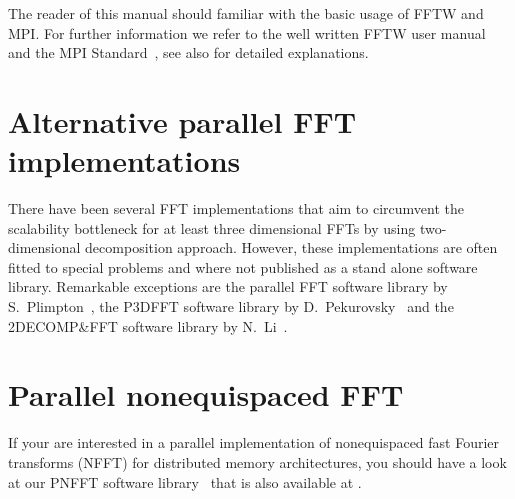 The reader of this manual should familiar with the basic usage of FFTW and MPI.
For further information we refer to the well written FFTW user manual~\cite{fftw-manual} and
the MPI Standard~\cite{MPI-2.2}, see also \cite{GrLuTh99} for detailed explanations.

\section{Alternative parallel FFT implementations}
There have been several FFT implementations that aim to circumvent the scalability bottleneck
for at least three dimensional FFTs by using two-dimensional decomposition approach.
However, these implementations are often fitted to special problems and where not published
as a stand alone software library. 
Remarkable exceptions are the parallel FFT software library by S.~Plimpton~\cite{Pl97,sandiafft},
the P3DFFT software library by D.~Pekurovsky~\cite{Pe12,p3dfft} and the \mbox{2DECOMP\&FFT} software library by N.~Li~\cite{Li2010, 2decompfft}.

\section{Parallel nonequispaced FFT}
If your are interested in a parallel implementation of nonequispaced fast Fourier
transforms (NFFT) for distributed memory architectures, you should have a look at our PNFFT software library~\cite{pnfft, PiPo13}
that is also available at \webpnfft.

